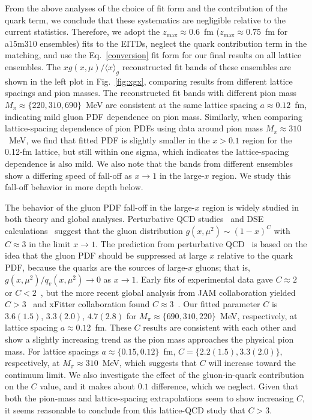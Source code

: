 From the above analyses of the choice of fit form and the contribution of the quark term, we conclude that these systematics are negligible relative to the current statistics.
Therefore, we adopt the $z_\text{max}\approx 0.6$~fm ($z_\text{max}\approx 0.75$~fm for a15m310 ensembles) fits to the EITDs, neglect the quark contribution term in the matching, and use the Eq.~\ref{conversion} fit form for our final results on all lattice ensembles.
The $xg(x, \mu)/\langle x \rangle_g$ reconstructed fit bands of these ensembles are shown in the left plot in Fig.~\ref{fig:xgx}, comparing results from different lattice spacings and pion masses.
The reconstructed fit bands with different pion mass $M_\pi\approx\{220,310,690\}$~MeV are consistent at the same lattice spacing $a\approx 0.12$~fm, indicating mild gluon PDF dependence on pion mass.
Similarly, when comparing lattice-spacing dependence of pion PDFs using data around pion mass $M_\pi\approx 310$~MeV, we find that fitted PDF is slightly smaller in the $x>0.1$ region for the 0.12-fm lattice, but still within one sigma, which indicates the lattice-spacing dependence is also mild.
We also note that the bands from different ensembles show a differing speed of fall-off as $x\to 1$ in the large-$x$ region.
We study this fall-off behavior in more depth below.

The behavior of the gluon PDF fall-off in the large-$x$ region is widely studied in both theory and global analyses.
Perturbative QCD studies~\cite{Close:1977qx,Sivers:1982wk} and DSE calculations~\cite{Bednar:2018mtf,Freese:2021zne} suggest that the gluon distribution $g(x,\mu^2) \sim (1-x)^C$ with $C\approx 3$ in the limit $x\to 1$.
The prediction from perturbative QCD~\cite{Sivers:1982wk} is based on the idea that the gluon PDF should be suppressed at large $x$ relative to the quark PDF, because the quarks are the sources of large-$x$ gluons;
that is, $g(x,\mu^2)/q_v(x,\mu^2)\to 0$ as $x\to 1$.
Early fits of experimental data gave $C\approx 2$~\cite{Aurenche:1989sx,Sutton:1991ay} or $C<2$~\cite{Gluck:1991ey,Gluck:1999xe}, but the more recent global analysis from JAM collaboration yielded $C>3$~\cite{Barry:2018ort,Cao:2021aci} and xFitter collaboration found $C\approx 3$~\cite{Novikov:2020snp}.
Our fitted parameter $C$ is $3.6(1.5)$, $3.3(2.0)$, $4.7(2.8)$ for $M_\pi\approx\{690,310,220\}$~MeV, respectively, at lattice spacing $a\approx 0.12$~fm.
These $C$ results are consistent with each other and show a slightly increasing trend as the pion mass approaches the physical pion mass.
For lattice spacings $a\approx\{0.15,0.12\}$~fm, $C=\{2.2(1.5),3.3(2.0)\}$, respectively, at $M_\pi\approx 310$~MeV, which suggests that $C$ will increase toward the continuum limit.
We also investigate the effect of the gluon-in-quark contribution on the $C$ value, and it makes about $0.1$ difference, which we neglect.
Given that both the pion-mass and lattice-spacing extrapolations seem to show increasing $C$, it seems reasonable to conclude from this lattice-QCD study that $C>3$.

